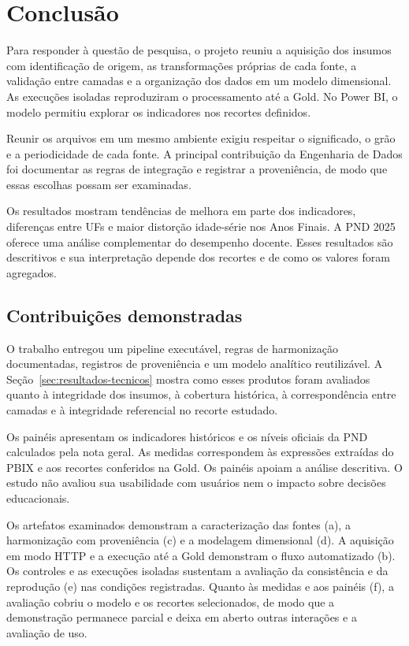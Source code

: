 \chapter[Conclusão]{Conclusão}

Para responder à questão de pesquisa, o projeto reuniu a aquisição dos insumos com identificação de origem, as transformações próprias de cada fonte, a validação entre camadas e a organização dos dados em um modelo dimensional. As execuções isoladas reproduziram o processamento até a Gold. No Power BI, o modelo permitiu explorar os indicadores nos recortes definidos.

Reunir os arquivos em um mesmo ambiente exigiu respeitar o significado, o grão e a periodicidade de cada fonte. A principal contribuição da Engenharia de Dados foi documentar as regras de integração e registrar a proveniência, de modo que essas escolhas possam ser examinadas.

Os resultados mostram tendências de melhora em parte dos indicadores, diferenças entre UFs e maior distorção idade-série nos Anos Finais. A PND 2025 oferece uma análise complementar do desempenho docente. Esses resultados são descritivos e sua interpretação depende dos recortes e de como os valores foram agregados.

\section{Contribuições demonstradas}

O trabalho entregou um pipeline executável, regras de harmonização documentadas, registros de proveniência e um modelo analítico reutilizável. A Seção~\ref{sec:resultados-tecnicos} mostra como esses produtos foram avaliados quanto à integridade dos insumos, à cobertura histórica, à correspondência entre camadas e à integridade referencial no recorte estudado.

Os painéis apresentam os indicadores históricos e os níveis oficiais da PND calculados pela nota geral. As medidas correspondem às expressões extraídas do PBIX e aos recortes conferidos na Gold. Os painéis apoiam a análise descritiva. O estudo não avaliou sua usabilidade com usuários nem o impacto sobre decisões educacionais.

Os artefatos examinados demonstram a caracterização das fontes (a), a harmonização com proveniência (c) e a modelagem dimensional (d). A aquisição em modo HTTP e a execução até a Gold demonstram o fluxo automatizado (b). Os controles e as execuções isoladas sustentam a avaliação da consistência e da reprodução (e) nas condições registradas. Quanto às medidas e aos painéis (f), a avaliação cobriu o modelo e os recortes selecionados, de modo que a demonstração permanece parcial e deixa em aberto outras interações e a avaliação de uso.

